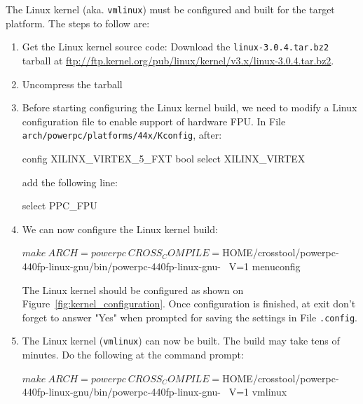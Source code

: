 The Linux kernel (aka. \texttt{vmlinux}) must be configured and built for the target platform.
\noindent The steps to follow are:
\begin{enumerate}
\item Get the Linux kernel source code: Download the \texttt{linux-3.0.4.tar.bz2} tarball at \url{ftp://ftp.kernel.org/pub/linux/kernel/v3.x/linux-3.0.4.tar.bz2}.
\item Uncompress the tarball
\item Before starting configuring the Linux kernel build, we need to modify a Linux configuration file to enable support of hardware FPU.
In File \texttt{arch/powerpc/platforms/44x/Kconfig}, after:
\begin{script}
 config XILINX_VIRTEX_5_FXT
        bool
        select XILINX_VIRTEX
\end{script}
\noindent add the following line:
\begin{script}
        select PPC_FPU
\end{script}
\item We can now configure the Linux kernel build:
\begin{script}
   $ make \
       ARCH=powerpc \
       CROSS_COMPILE=${HOME}/crosstool/powerpc-440fp-linux-gnu/bin/powerpc-440fp-linux-gnu- \
       V=1 menuconfig
\end{script}
The Linux kernel should be configured as shown on Figure~\ref{fig:kernel_configuration}.
Once configuration is finished, at exit don't forget to answer "Yes" when prompted for saving the settings in File \texttt{.config}.
\item The Linux kernel (\texttt{vmlinux}) can now be built.
The build may take tens of minutes.
Do the following at the command prompt:
\begin{script}
   $ make \
       ARCH=powerpc \
       CROSS_COMPILE=${HOME}/crosstool/powerpc-440fp-linux-gnu/bin/powerpc-440fp-linux-gnu- \
       V=1 vmlinux
\end{script}
\end{enumerate}


